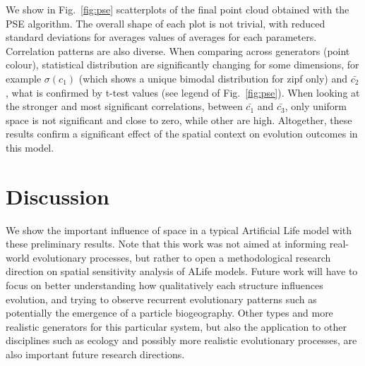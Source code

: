 \documentclass[letterpaper]{article}
\begin{document}

We show in Fig.~\ref{fig:pse} scatterplots of the final point cloud obtained with the PSE algorithm. The overall shape of each plot is not trivial, with reduced standard deviations for averages values of averages for each parameters. Correlation patterns are also diverse. When comparing across generators (point colour), statistical distribution are significantly changing for some dimensions, for example $\sigma(c_1)$ (which shows a unique bimodal distribution for zipf only) and $\bar{c_2}$, what is confirmed by t-test values (see legend of Fig.~\ref{fig:pse}). When looking at the stronger and most significant correlations, between $\bar{c_1}$ and $\bar{c_3}$, only uniform space is not significant and close to zero, while other are high.
Altogether, these results confirm a significant effect of the spatial context on evolution outcomes in this model.




\section{Discussion}


We show the important influence of space in a typical Artificial Life model with these preliminary results. Note that this work was not aimed at informing real-world evolutionary processes, but rather to open a methodological research direction on spatial sensitivity analysis of ALife models. Future work will have to focus on better understanding how qualitatively each structure influences evolution, and trying to observe recurrent evolutionary patterns such as potentially the emergence of a particle biogeography. Other types and more realistic generators for this particular system, but also the application to other disciplines such as ecology and possibly more realistic evolutionary processes, are also important future research directions.

\footnotesize
%
\end{document}
